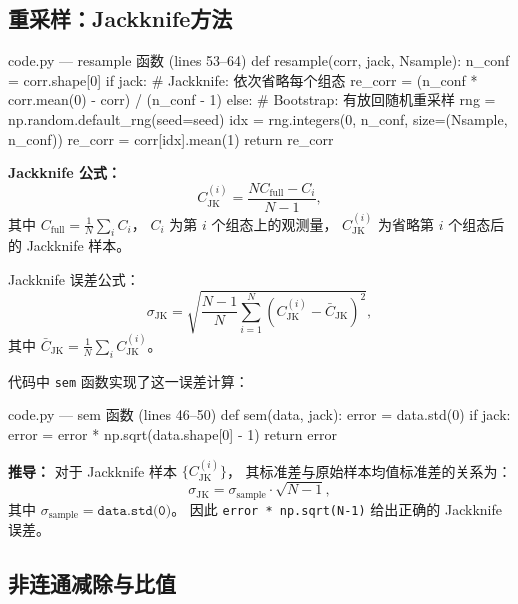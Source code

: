\documentclass[12pt,a4paper]{ctexart}
\begin{document}
\subsection{重采样：Jackknife方法}

\begin{codeblock}{code.py --- resample 函数 (lines 53--64)}
def resample(corr, jack, Nsample):
    n_conf = corr.shape[0]
    if jack:
        # Jackknife: 依次省略每个组态
        re_corr = (n_conf * corr.mean(0) - corr) / (n_conf - 1)
    else:
        # Bootstrap: 有放回随机重采样
        rng = np.random.default_rng(seed=seed)
        idx = rng.integers(0, n_conf, size=(Nsample, n_conf))
        re_corr = corr[idx].mean(1)
    return re_corr
\end{codeblock}

\textbf{Jackknife 公式：}
\begin{equation}\label{eq:jackknife}
\boxed{
C^{(i)}_{\text{JK}} = \frac{N C_{\text{full}} - C_i}{N - 1},
}
\end{equation}
其中 $C_{\text{full}} = \frac{1}{N} \sum_i C_i$，
$C_i$ 为第 $i$ 个组态上的观测量，
$C^{(i)}_{\text{JK}}$ 为省略第 $i$ 个组态后的 Jackknife 样本。

Jackknife 误差公式：
\begin{equation}\label{eq:jackknife_error}
\boxed{
\sigma_{\text{JK}} = \sqrt{\frac{N-1}{N}
    \sum_{i=1}^{N} (C^{(i)}_{\text{JK}} - \bar{C}_{\text{JK}})^2},
}
\end{equation}
其中 $\bar{C}_{\text{JK}} = \frac{1}{N} \sum_i C^{(i)}_{\text{JK}}$。

代码中 \texttt{sem} 函数实现了这一误差计算：
\begin{codeblock}{code.py --- sem 函数 (lines 46--50)}
def sem(data, jack):
    error = data.std(0)
    if jack:
        error = error * np.sqrt(data.shape[0] - 1)
    return error
\end{codeblock}

\textbf{推导：} 对于 Jackknife 样本 $\{C^{(i)}_{\text{JK}}\}$，
其标准差与原始样本均值标准差的关系为：
\begin{equation*}
\sigma_{\text{JK}} = \sigma_{\text{sample}} \cdot \sqrt{N-1},
\end{equation*}
其中 $\sigma_{\text{sample}} = \texttt{data.std(0)}$。
因此 \texttt{error * np.sqrt(N-1)} 给出正确的 Jackknife 误差。

\subsection{非连通减除与比值}
\end{document}
